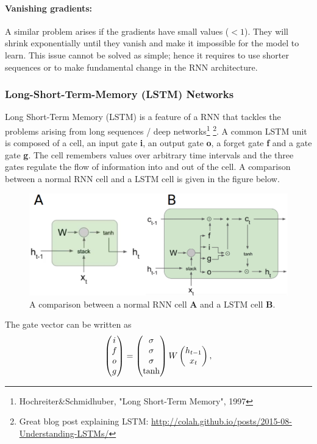 \documentclass[main]{subfiles}
\begin{document}
\paragraph{Vanishing gradients:} A similar problem arises if the gradients have small values ($<1$). They will shrink exponentially until they vanish and make it impossible for the model to learn. This issue cannot be solved as simple; hence it requires to use shorter sequences or to make fundamental change in the RNN architecture. 


\subsubsection{Long-Short-Term-Memory (LSTM) Networks}
Long Short-Term Memory (LSTM) is a feature of a RNN that tackles the problems arising from long sequences / deep networks\footnote{Hochreiter\&Schmidhuber, "Long Short-Term Memory", 1997} \footnote{Great blog post explaining LSTM: \url{http://colah.github.io/posts/2015-08-Understanding-LSTMs/}}. A common LSTM unit is composed of a cell, an input gate \textbf{i}, an output gate \textbf{o}, a forget gate \textbf{f} and a gate gate \textbf{g}. The cell remembers values over arbitrary time intervals and the three gates regulate the flow of information into and out of the cell. A comparison between a normal RNN cell and a LSTM cell is given in the figure below.  
\begin{figure}[H]
    \centering
    \includegraphics[width=0.99\linewidth]{13_LearningInRecurrentNeuronalNetworks/figures/lstm.png}
    \caption{A comparison between a normal RNN cell \textbf{A} and a LSTM cell \textbf{B}.}
    \label{fig:unroll}
\end{figure}
The gate vector can be written as 
\begin{equation}
    \begin{pmatrix}i\\ f\\ o\\ g\end{pmatrix} = \begin{pmatrix}\sigma\\ \sigma\\ \sigma\\ \tanh\end{pmatrix} W \begin{pmatrix}h_{t-1}\\ x_t\end{pmatrix},
\end{equation}
\end{document}

